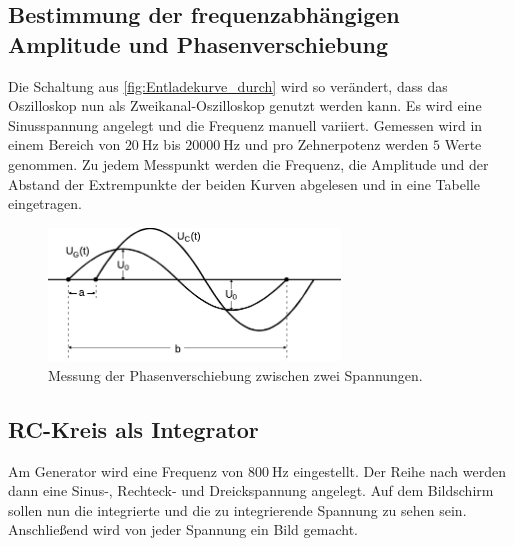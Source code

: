 \subsection{Bestimmung der frequenzabhängigen Amplitude und Phasenverschiebung} %
\label{sub:Freque_A&P_durch}
\noindent Die Schaltung aus \autoref{fig:Entladekurve_durch} wird so verändert, dass das Oszilloskop nun als Zweikanal-Oszilloskop genutzt werden kann.
Es wird eine Sinusspannung angelegt und die Frequenz manuell variiert.
Gemessen wird in einem Bereich von $\qty{20}{\hertz}$ bis $\qty{20000}{\hertz}$ und pro Zehnerpotenz werden $5$ Werte genommen.
Zu jedem Messpunkt werden die Frequenz, die Amplitude und der Abstand der Extrempunkte der beiden Kurven abgelesen und in eine Tabelle eingetragen.
\begin{figure}[H]
    \centering
    \includegraphics[width=0.69\textwidth]{build/Abb_7_edit.pdf}
    \caption {Messung der Phasenverschiebung zwischen zwei Spannungen.\cite{V353}}
    \label{fig:Freque_A&P_durch}
\end{figure}
\subsection{RC-Kreis als Integrator} %
\label{sub:Integrator_durch}
Am Generator wird eine Frequenz von $\qty{800}{\hertz}$ eingestellt.
Der Reihe nach werden dann eine Sinus-, Rechteck- und Dreickspannung angelegt.
Auf dem Bildschirm sollen nun die integrierte und die zu integrierende Spannung zu sehen sein.
Anschließend wird von jeder Spannung ein Bild gemacht.

